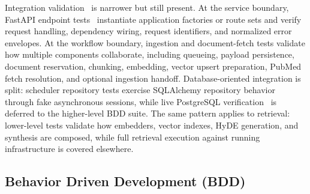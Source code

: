 Integration validation~\cite{istqb2024ctfl} is narrower but still present. At the service boundary, FastAPI endpoint tests~\cite{fastapi2026docs} instantiate application factories or route sets and verify request handling, dependency wiring, request identifiers, and normalized error envelopes. At the workflow boundary, ingestion and document-fetch tests validate how multiple components collaborate, including queueing, payload persistence, document reservation, chunking, embedding, vector upsert preparation, PubMed fetch resolution, and optional ingestion handoff. Database-oriented integration is split: scheduler repository tests exercise SQLAlchemy repository behavior~\cite{sqlalchemy2026docs} through fake asynchronous sessions, while live PostgreSQL verification~\cite{postgresql2026docs} is deferred to the higher-level BDD suite. The same pattern applies to retrieval: lower-level tests validate how embedders, vector indexes, HyDE generation, and synthesis are composed, while full retrieval execution against running infrastructure is covered elsewhere.

\subsection{Behavior Driven Development (BDD)}

